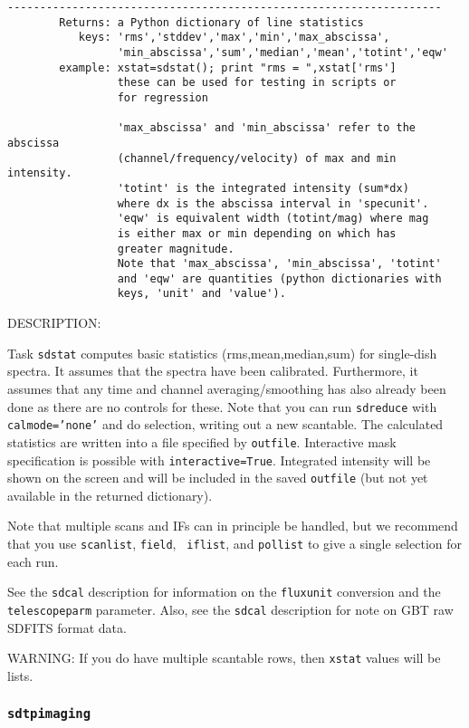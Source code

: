 \begin{verbatim}
-------------------------------------------------------------------
        Returns: a Python dictionary of line statistics
           keys: 'rms','stddev','max','min','max_abscissa',
                 'min_abscissa','sum','median','mean','totint','eqw'
        example: xstat=sdstat(); print "rms = ",xstat['rms']
                 these can be used for testing in scripts or
                 for regression

                 'max_abscissa' and 'min_abscissa' refer to the abscissa
                 (channel/frequency/velocity) of max and min intensity.
                 'totint' is the integrated intensity (sum*dx)
                 where dx is the abscissa interval in 'specunit'.
                 'eqw' is equivalent width (totint/mag) where mag
                 is either max or min depending on which has
                 greater magnitude. 
                 Note that 'max_abscissa', 'min_abscissa', 'totint' 
                 and 'eqw' are quantities (python dictionaries with
                 keys, 'unit' and 'value').

\end{verbatim}

DESCRIPTION: 

Task {\tt sdstat} computes basic statistics (rms,mean,median,sum)
for single-dish spectra.  It assumes that the spectra have
been calibrated.  Furthermore, it assumes that any
time and channel averaging/smoothing has also already been done as
there are no controls for these. Note that you can run {\tt sdreduce}
with {\tt calmode='none'} and do selection, writing out a new
scantable.
The calculated statistics are written into a file specified by
{\tt outfile}.
Interactive mask specification is possible with {\tt interactive=True}.
Integrated intensity will be shown on the screen and will be included
in the saved {\tt outfile} (but not yet available in the returned dictionary).

Note that multiple scans and IFs can in principle be handled, but
we recommend that you use {\tt scanlist}, {\tt field}, {\tt
iflist}, and {\tt pollist} to give a single selection for each run.

See the {\tt sdcal} description for information on the {\tt fluxunit} 
conversion and the {\tt telescopeparm} parameter.
Also, see the {\tt sdcal} description for note on GBT raw SDFITS format data.

WARNING: If you do have multiple scantable rows, then {\tt xstat}
values will be lists.


\subsubsection{{\tt sdtpimaging}}
\label{section:sd.sdtasks.tasks.sdtpimaging}

